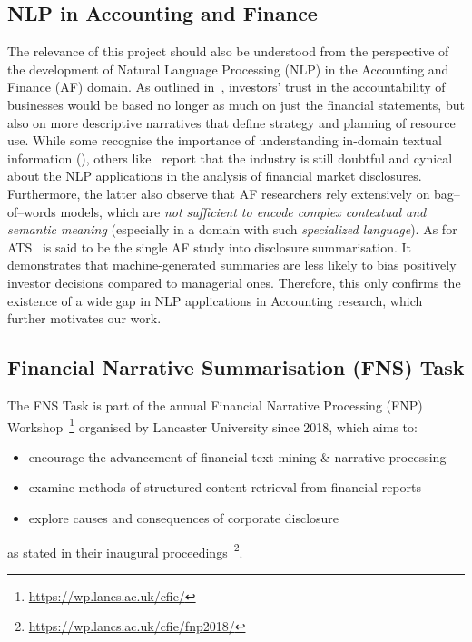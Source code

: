 \subsection{NLP in Accounting and Finance}\label{subsec:nlp-in-accounting-and-finance}
The relevance of this project should also be understood from the perspective of the development of Natural Language Processing (NLP) in the Accounting and Finance (AF) domain.
As outlined in~\cite{elliott1998accounting}, investors’ trust in the accountability of businesses would be based no longer as much on just the financial statements, but also on more descriptive narratives that define strategy and planning of resource use.
While some recognise the importance of understanding in-domain textual information (\cite{li2010textual}), others like~\cite{el-haj2019meaning} report that the industry is still doubtful and cynical about the NLP applications in the analysis of financial market disclosures.
Furthermore, the latter also observe that AF researchers rely extensively on bag--of--words models, which are \emph{not sufficient to encode complex contextual and semantic meaning} (especially in a domain with such \emph{specialized language}).
As for ATS~\cite{hollander-white-af} is said to be the single AF study into disclosure summarisation.
It demonstrates that machine-generated summaries are less likely to bias positively investor decisions compared to managerial ones.
Therefore, this only confirms the existence of a wide gap in NLP applications in Accounting research, which further motivates our work.

\subsection{Financial Narrative Summarisation (FNS) Task} \label{subsec:fns}
The FNS Task is part of the annual Financial Narrative Processing (FNP) Workshop~\footnote{\url{https://wp.lancs.ac.uk/cfie/}} organised by Lancaster University since 2018, which aims to:
\begin{itemize}
    \item encourage the advancement of financial text mining \& narrative processing
    \item examine methods of structured content retrieval from financial reports
    \item explore causes and consequences of corporate disclosure
\end{itemize} as stated in their inaugural proceedings~\footnote{\url{https://wp.lancs.ac.uk/cfie/fnp2018/}}.

